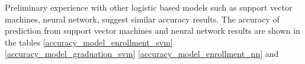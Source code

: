 \documentclass[12pt,english]{report}
\begin{document}

Preliminary experience with other logistic based models such as support vector
machines, neural network,  suggest similar accuracy results. The accuracy of
prediction from support vector machines and neural network results are shown in
the tables \ref{accuracy_model_enrollment_svm} %
\ref{accuracy_model_graduation_svm}%
\ref{accuracy_model_enrollment_nn} and
\end{document}
